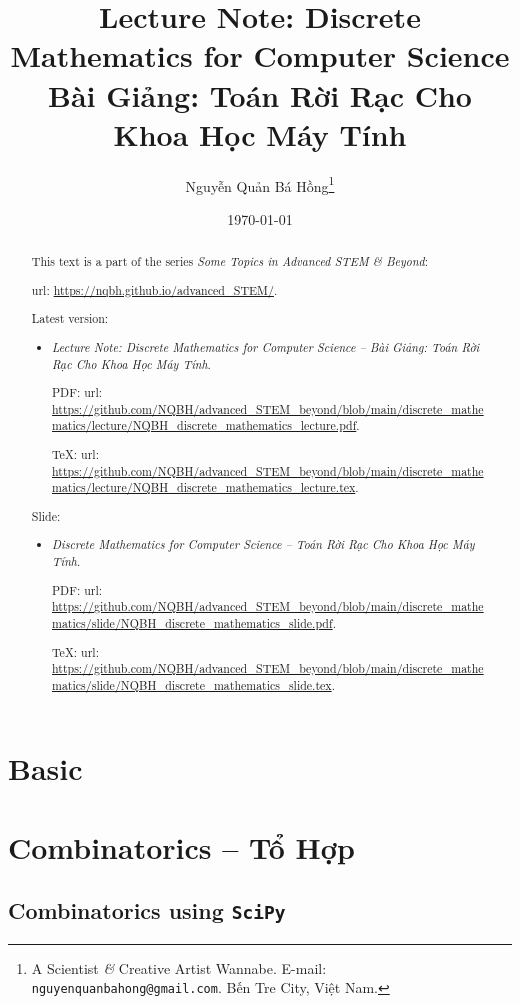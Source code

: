 \documentclass{article}
\title{Lecture Note: Discrete Mathematics for Computer Science\\Bài Giảng: Toán Rời Rạc Cho Khoa Học Máy Tính}
\author{Nguyễn Quản Bá Hồng\footnote{A Scientist {\it\&} Creative Artist Wannabe. E-mail: {\tt nguyenquanbahong@gmail.com}. Bến Tre City, Việt Nam.}}
\date{\today}
\begin{document}
\maketitle
\begin{abstract}
	This text is a part of the series {\it Some Topics in Advanced STEM \& Beyond}:
	
	{\sc url}: \url{https://nqbh.github.io/advanced_STEM/}.
	
	Latest version:
	\begin{itemize}
		\item {\it Lecture Note: Discrete Mathematics for Computer Science -- Bài Giảng: Toán Rời Rạc Cho Khoa Học Máy Tính}.
		
		PDF: {\sc url}: \url{https://github.com/NQBH/advanced_STEM_beyond/blob/main/discrete_mathematics/lecture/NQBH_discrete_mathematics_lecture.pdf}.
		
		\TeX: {\sc url}: \url{https://github.com/NQBH/advanced_STEM_beyond/blob/main/discrete_mathematics/lecture/NQBH_discrete_mathematics_lecture.tex}.
	\end{itemize}
	Slide:
	\begin{itemize}
		\item {\it Discrete Mathematics for Computer Science -- Toán Rời Rạc Cho Khoa Học Máy Tính}.
		
		PDF: {\sc url}: \url{https://github.com/NQBH/advanced_STEM_beyond/blob/main/discrete_mathematics/slide/NQBH_discrete_mathematics_slide.pdf}.
		
		\TeX: {\sc url}: \url{https://github.com/NQBH/advanced_STEM_beyond/blob/main/discrete_mathematics/slide/NQBH_discrete_mathematics_slide.tex}.
	\end{itemize}
\end{abstract}
\tableofcontents


\section{Basic}


\section{Combinatorics -- Tổ Hợp}

\subsection{Combinatorics using {\tt SciPy}}
\end{document}

